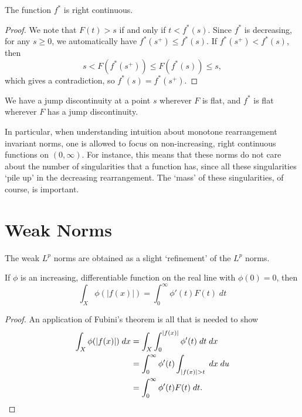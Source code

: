 \begin{theorem}
    The function $f^*$ is right continuous.
\end{theorem}
\begin{proof}
    We note that $F(t) > s$ if and only if $t < f^*(s)$. Since $f^*$ is decreasing, for any $s \geq 0$, we automatically have $f^*(s^+) \leq f^*(s)$. If $f^*(s^+) < f^*(s)$, then
    \[ s < F \left( f^*(s^+) \right) \leq F(f^*(s)) \leq s, \]
    which gives a contradiction, so $f^*(s) = f^*(s^+)$.
\end{proof}

\begin{remark}
    We have a jump discontinuity at a point $s$ wherever $F$ is flat, and $f^*$ is flat wherever $F$ has a jump discontinuity.
\end{remark}

In particular, when understanding intuition about monotone rearrangement invariant norms, one is allowed to focus on non-increasing, right continuous functions on $(0,\infty)$. For instance, this means that these norms do not care about the number of singularities that a function has, since all these singularities `pile up' in the decreasing rearrangement. The `mass' of these singularities, of course, is important.

\section{Weak Norms}

The weak $L^p$ norms are obtained as a slight `refinement' of the $L^p$ norms.

\begin{theorem}
  If $\phi$ is an increasing, differentiable function on the real line with $\phi(0) = 0$, then
  \[ \int_X \phi(|f(x)|) = \int_0^\infty \phi'(t) F(t)\; dt \]
\end{theorem}
\begin{proof}
  An application of Fubini's theorem is all that is needed to show
  \begin{align*}
    \int_X \phi(|f(x)|)\; dx &= \int_X \int_0^{|f(x)|} \phi'(t)\; dt\; dx\\
    &= \int_0^\infty \phi'(t) \int_{|f(x)| > t}\; dx\; du\\
    &= \int_0^\infty \phi'(t) F(t)\; dt. \qedhere
  \end{align*}
\end{proof}

